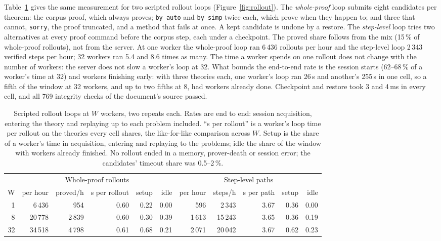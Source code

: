\documentclass[11pt]{article}
\newcommand{\code}[1]{\colorbox{gray!12}{\texttt{\vphantom{Ag}#1}}}
\begin{document}
Table~\ref{tab:rollouts} gives the same measurement for two scripted
rollout loops (Figure~\ref{fig:rollout}). The \emph{whole-proof} loop
submits eight candidates per theorem: the corpus proof, which always
proves; \code{by auto} and \code{by simp} twice each, which prove when
they happen to; and three that cannot, \code{sorry}, the proof truncated,
and a method that fails at once. A kept candidate is undone by a restore.
The \emph{step-level} loop tries two alternatives at every proof command
before the corpus step, each under a checkpoint. The proved share follows
from the mix (15\,\% of whole-proof rollouts), not from the server. At one
worker the whole-proof loop ran 6\,436 rollouts per hour and the
step-level loop 2\,343 verified steps per hour; 32 workers ran 5.4 and 8.6
times as many. The time a worker spends on one rollout does not change
with the number of workers: the server does not slow a worker's loop at
32. What bounds the end-to-end rate is the session starts (62--68\,\% of a
worker's time at 32) and workers finishing early: with three theories
each, one worker's loop ran 26\,s and another's 255\,s in one cell, so a
fifth of the window at 32 workers, and up to two fifths at 8, had workers
already done. Checkpoint and restore took 3 and 4\,ms in every cell, and
all 769 integrity checks of the document's source passed.

\begin{table}[!htb]
\centering\small
\setlength{\tabcolsep}{3.5pt}
\begin{tabular}{@{}r rrrrr rrrrr@{}}
\toprule
 & \multicolumn{5}{c}{Whole-proof rollouts} & \multicolumn{5}{c}{Step-level paths} \\
\cmidrule(lr){2-6} \cmidrule(lr){7-11}
W & per hour & proved/h & s per rollout & setup & idle & per hour & steps/h & s per path & setup & idle \\
\midrule
1  & 6\,436  & 954    & 0.60 & 0.22 & 0.00 & 596    & 2\,343  & 3.67 & 0.36 & 0.00 \\
8  & 20\,778 & 2\,839 & 0.60 & 0.30 & 0.39 & 1\,613 & 15\,243 & 3.65 & 0.36 & 0.19 \\
32 & 34\,518 & 4\,798 & 0.61 & 0.68 & 0.21 & 2\,071 & 20\,042 & 3.67 & 0.62 & 0.23 \\
\bottomrule
\end{tabular}
\caption{Scripted rollout loops at $W$ workers, two repeats each. Rates
  are end to end: session acquisition, entering the theory and replaying
  up to each problem included. ``s per rollout'' is a worker's loop time
  per rollout on the theories every cell shares, the like-for-like
  comparison across $W$. Setup is the share of a worker's time in
  acquisition, entering and replaying to the problems; idle the share of
  the window with workers already finished. No rollout ended in a memory,
  prover-death or session error; the candidates' timeout share was
  0.5--2\,\%.}
\label{tab:rollouts}
\end{table}
\end{document}
